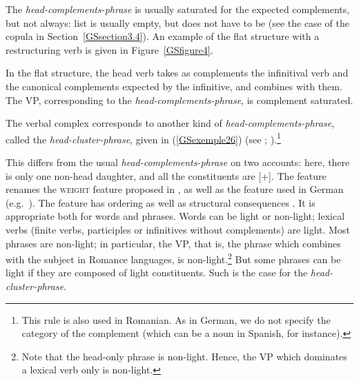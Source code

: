 {%



The \emph{head-complements-phrase} is usually saturated for the expected complements, but not always: list  is usually empty, but does not have to be (see the case of the copula in Section~\ref{GSsection3.4}). An example of the flat structure with a restructuring verb is given in Figure~\ref{GSfigure4}.

In the flat structure, the head verb takes as complements the infinitival verb and the canonical complements expected by the infinitive, and combines with them. The VP, corresponding to the \emph{head-complements-phrase}, is complement saturated.

The verbal complex corresponds to another kind of \emph{head-complements-phrase}, called the \emph{head-cluster-phrase}, given in (\ref{GSexemple26}) (see \citealt[6]{Mueller2002b}; \citealt[39]{muller2018clause}).\footnote{This rule is also used in Romanian. As in German, we do not specify the category of the complement (which can be a noun in Spanish, for instance).} 

\begin{exe}
\end{exe}

This differs from the usual \emph{head-complements-phrase} on two accounts: here, there is only one non-head daughter, and all the constituents are [\light +]. The \light feature \citep{bonami2012phrase} renames the \textsc{weight} feature proposed in \cite{abeille2000french}, as well as the \lex feature used in German (e.g.\ \citealt{HN89b, HN94a, Kiss95a, Meurers2000b-Short, Mueller2002b, hohle2018spuren}). The \light feature has ordering as well as structural consequences \citep{abeille2000french, AG2010}. It is appropriate both for words and phrases. Words can be light or non-light; lexical verbs (finite verbs, participles or infinitives without complements) are light. Most phrases are non-light; in particular, the VP, that is, the phrase which combines with the subject in Romance languages, is non-light.\footnote{Note that the head-only phrase is non-light. Hence, the VP which dominates a lexical verb only is non-light.} But some phrases can be light if they are composed of light constituents. Such is the case for the \emph{head-cluster-phrase}. 

}
